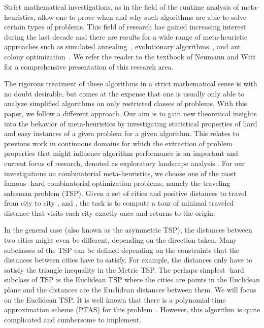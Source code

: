 \documentclass{article}
\begin{document}
Strict mathematical investigations, as in the field of the runtime
analysis of meta-heuristics, allow one to prove when and why such
algorithms are able to solve certain types of problems. This field of
research has gained increasing interest during the last decade and
there are results for a wide range of meta-heuristic approaches such as
simulated annealing~\cite{WegenerSimulated}, evolutionary
algorithms~\cite{DJWoneone}, and ant colony
optimization~\cite{NeumannWittAlgorithmica09}. We refer the reader to
the textbook of Neumann and Witt~\cite{BookNeuWit} for a comprehensive
presentation of this research area.

The rigorous treatment of these algorithms in a strict mathematical
sense is with no doubt desirable, but comes at the expense that one is
usually only able to analyze simplified algorithms on only restricted
classes of problems. With this paper, we follow a different
approach. Our aim is to gain new theoretical insights into the
behavior of meta-heuristics by investigating statistical properties
of hard and easy instances of a given problem for a given algorithm.
This relates to previous work in continuous domains for which the extraction of problem properties that might influence algorithm performance is an
important and current focus of research, denoted as exploratory landscape analysis \cite{MBTPWR11,B2012}. For our investigations on combinatorial meta-heuristics, we choose one of the most famous -hard
combinatorial optimization problems, namely the traveling salesman
problem (TSP). Given a set of  cities and positive distances
 to travel from city  to city ,  and
, the task is to compute a tour of minimal traveled distance
that visits each city exactly once and returns to the origin.

In the general case (also known as the asymmetric TSP), the distances
between two cities might even be different, depending on the direction
taken.  Many subclasses of the TSP can be defined depending on the
constraints that the distances between cities have to satisfy. For
example, the distances only have to satisfy the triangle inequality in
the Metric TSP.  The perhaps simplest -hard subclass of TSP is the
Euclidean TSP where the cities are points in the Euclidean plane and
the distances are the Euclidean distances between them. We will focus
on the Euclidean TSP. It is well known that there is a polynomial time
approximation scheme (PTAS) for this problem~\cite{Arora98}. However,
this algorithm is quite complicated and cumbersome to implement.
\end{document}
